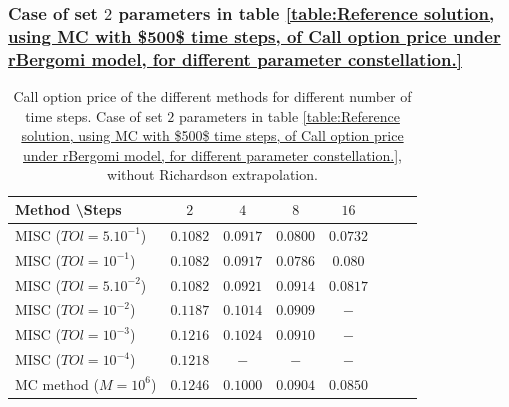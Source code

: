 \documentclass[11pt]{article}
\begin{document}
\FloatBarrier
\subsubsection{Case of set $2$ parameters in table \ref{table:Reference solution, using MC with $500$ time steps, of Call option price under rBergomi model, for different parameter constellation.}}
\label{sec:Case of set $2$ parameters}


\begin{table}[h!]
	\centering
	\begin{tabular}{l*{6}{c}r}
		Method \textbackslash  Steps            & $2$ & $4$ & $8$ & $16$  \\
		\hline
			MISC ($TOl=5.10^{-1}$)  & $0.1082$ & $0.0917$ & $0.0800$ & $0.0732$  \\
		MISC ($TOl=10^{-1}$)  & $0.1082$ & $0.0917$ & $0.0786$ & $0.080$  \\
			MISC ($TOl=5.10^{-2}$)  & $0.1082$ & $0.0921$ & $0.0914$ & $0.0817$  \\
		MISC ($TOl=10^{-2}$)  & $0.1187$ &  $0.1014$ & $0.0909$ & $-$  \\
		MISC ($TOl=10^{-3}$)        & $0.1216$ &$0.1024$ &  $0.0910$ &  $-$ \\
			MISC ($TOl=10^{-4}$)        & $0.1218$ &$-$ &  $-$ &  $-$ \\
	\hline
		MC method ($M=10^{6}$)   & $0.1246 $  & $0.1000 $  & $0.0904$ & $0.0850 $ \\		
		\hline
	\end{tabular}
	\caption{ Call option price of the different methods for different number of time steps. Case of set $2$ parameters in table \ref{table:Reference solution, using MC with $500$ time steps, of Call option price under rBergomi model, for different parameter constellation.}, without Richardson extrapolation.}
	\label{table: Call option price of the different methods for different number of time steps. Case set 2}
\end{table}
\end{document}
